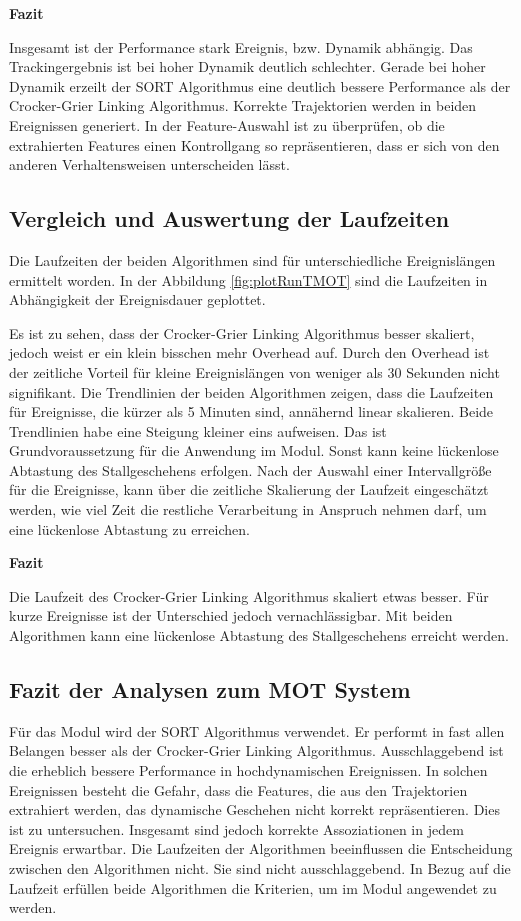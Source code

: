\textbf{Fazit}\par
Insgesamt ist der Performance stark Ereignis, bzw. Dynamik abhängig. Das Trackingergebnis ist bei hoher Dynamik deutlich schlechter. Gerade bei hoher Dynamik erzeilt der SORT Algorithmus eine deutlich bessere Performance als der Crocker-Grier Linking Algorithmus. Korrekte Trajektorien werden in beiden Ereignissen generiert. In der Feature-Auswahl ist zu überprüfen, ob die extrahierten Features einen Kontrollgang so repräsentieren, dass er sich von den anderen Verhaltensweisen unterscheiden lässt.


\subsection{Vergleich und Auswertung der Laufzeiten}
Die Laufzeiten der beiden Algorithmen sind für unterschiedliche Ereignislängen ermittelt worden. In der Abbildung \ref{fig:plotRunTMOT} sind die Laufzeiten in Abhängigkeit der Ereignisdauer geplottet.


Es ist zu sehen, dass der Crocker-Grier Linking Algorithmus besser skaliert, jedoch weist er ein klein bisschen mehr Overhead auf. Durch den Overhead ist der zeitliche Vorteil für kleine Ereignislängen von weniger als 30 Sekunden nicht signifikant. Die Trendlinien der beiden Algorithmen zeigen, dass die Laufzeiten für Ereignisse, die kürzer als 5 Minuten sind, annähernd linear skalieren. Beide Trendlinien habe eine Steigung kleiner eins aufweisen. Das ist Grundvoraussetzung für die Anwendung im Modul. Sonst kann keine lückenlose Abtastung des Stallgeschehens erfolgen. Nach der Auswahl einer Intervallgröße für die Ereignisse, kann über die zeitliche Skalierung der Laufzeit eingeschätzt werden, wie viel Zeit die restliche Verarbeitung in Anspruch nehmen darf, um eine lückenlose Abtastung zu erreichen.  \dubpar

\textbf{Fazit}\par
Die Laufzeit des Crocker-Grier Linking Algorithmus skaliert etwas besser. Für kurze Ereignisse ist der Unterschied jedoch vernachlässigbar. Mit beiden Algorithmen kann eine lückenlose Abtastung des Stallgeschehens erreicht werden.

\subsection{Fazit der Analysen zum MOT System}
Für das Modul wird der SORT Algorithmus verwendet. Er performt in fast allen Belangen besser als der Crocker-Grier Linking Algorithmus. Ausschlaggebend ist die erheblich bessere Performance in hochdynamischen Ereignissen. In solchen Ereignissen besteht die Gefahr, dass die Features, die aus den Trajektorien extrahiert werden, das dynamische Geschehen nicht korrekt repräsentieren. Dies ist zu untersuchen. Insgesamt sind jedoch korrekte Assoziationen in jedem Ereignis erwartbar. Die Laufzeiten der Algorithmen beeinflussen die Entscheidung zwischen den Algorithmen nicht. Sie sind nicht ausschlaggebend. In Bezug auf die Laufzeit erfüllen beide Algorithmen die Kriterien, um im Modul angewendet zu werden. 